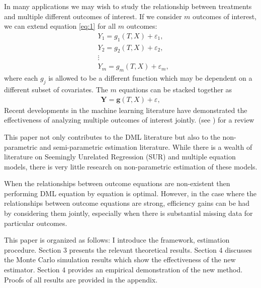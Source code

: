 \documentclass[12pt]{article}
\begin{document}
	In many applications we may wish to study the relationship between treatments and multiple different outcomes of interest. If we consider $m$ outcomes of interest, we can extend equation \ref{eq:1} for all $m$ outcomes:
	\begin{align*}
	& Y_1 = g_1(T,X) +\varepsilon_1,\\
	& Y_2 =  g_2(T,X) +\varepsilon_2,\\
	&\vdots\\
	&Y_m =  g_m(T,X) +\varepsilon_m,
	\end{align*}
	where each $g_j$ is allowed to be a different function which may be dependent on a different subset of covariates. The $m$ equations can be stacked together as
	\begin{align}
	\mathbf{Y} = \mathbf{g}(T,X) +\varepsilon\label{eq:2},
	\end{align}  
	Recent developments in the machine learning literature have demonstrated the effectiveness of analyzing multiple outcomes of interest jointly. (see \cite{borchani2015survey}) for a review
	
	This paper not only contributes to the DML literature but also to the non-parametric and semi-parametric estimation literature. While there is a wealth of literature on Seemingly Unrelated Regression (SUR) and multiple equation models, there is very little research on non-parametric estimation of these models. 
	
	When the relationships between outcome equations are non-existent then performing DML equation by equation is optimal. However, in the case where the relationships between outcome equations are strong, efficiency gains can be had by considering them jointly, especially when there is substantial missing data for particular outcomes. 
	
	This paper is organized as follows: I introduce the framework, estimation procedure. Section 3 presents the relevant theoretical results. Section 4 discusses the Monte Carlo simulation results which show the effectiveness of the new estimator. Section 4 provides an empirical demonstration of the new method. Proofs of all results are provided in the appendix. 
\end{document}
